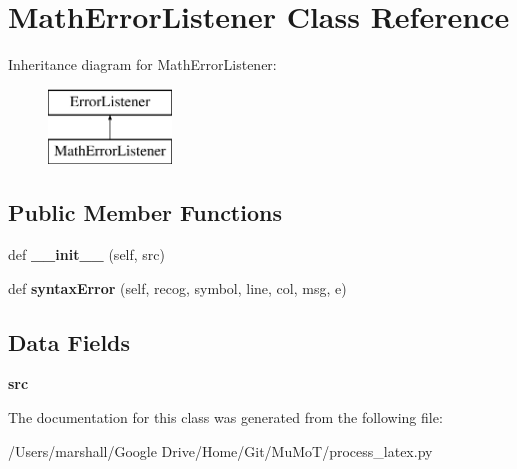 \hypertarget{classprocess__latex_1_1_math_error_listener}{}\section{Math\+Error\+Listener Class Reference}
\label{classprocess__latex_1_1_math_error_listener}
Inheritance diagram for Math\+Error\+Listener\+:\begin{figure}[H]
\begin{center}
\leavevmode
\includegraphics[height=2.000000cm]{classprocess__latex_1_1_math_error_listener}
\end{center}
\end{figure}
\subsection*{Public Member Functions}
\begin{DoxyCompactItemize}
\item 
\mbox{\label{classprocess__latex_1_1_math_error_listener_a0b02767ec0f56f89e652a1f6f89f2caf}} 
def {\bfseries \+\_\+\+\_\+init\+\_\+\+\_\+} (self, src)
\item 
\mbox{\label{classprocess__latex_1_1_math_error_listener_a79919f4f085e7d64a08324162b5b94a2}} 
def {\bfseries syntax\+Error} (self, recog, symbol, line, col, msg, e)
\end{DoxyCompactItemize}
\subsection*{Data Fields}
\begin{DoxyCompactItemize}
\item 
\mbox{\label{classprocess__latex_1_1_math_error_listener_a0e9117de7e6a340559202f88a1dbd9c6}} 
{\bfseries src}
\end{DoxyCompactItemize}


The documentation for this class was generated from the following file\+:\begin{DoxyCompactItemize}
\item 
/\+Users/marshall/\+Google Drive/\+Home/\+Git/\+Mu\+Mo\+T/process\+\_\+latex.\+py\end{DoxyCompactItemize}
